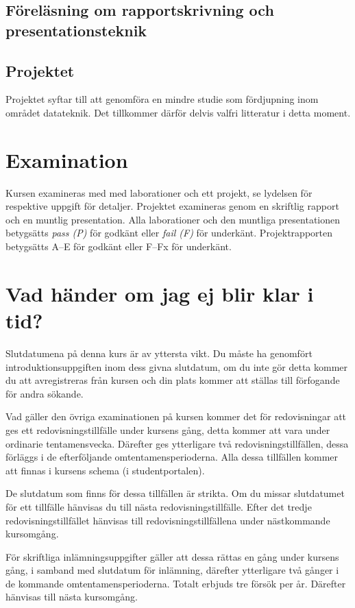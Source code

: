 \documentclass[a4paper,logo]{miunart}
\begin{document}
\subsection{Föreläsning om rapportskrivning och presentationsteknik}


\subsection{Projektet}
Projektet syftar till att genomföra en mindre studie som fördjupning inom 
området datateknik.
Det tillkommer därför delvis valfri litteratur i detta moment.


\section{Examination}
\label{sec:exam}
Kursen examineras med med laborationer och ett projekt, se lydelsen för 
respektive uppgift för detaljer.
Projektet examineras genom en skriftlig rapport och en muntlig presentation.
Alla laborationer och den muntliga presentationen betygsätts \emph{pass (P)} 
för godkänt eller \emph{fail (F)} för underkänt.
Projektrapporten betygsätts A--E för godkänt eller F--Fx för underkänt.


\section{Vad händer om jag ej blir klar i tid?}
\label{sec:late}
Slutdatumena på denna kurs är av yttersta vikt.
Du måste ha genomfört introduktionsuppgiften inom dess givna slutdatum, om du 
inte gör detta kommer du att avregistreras från kursen och din plats kommer att 
ställas till förfogande för andra sökande.

Vad gäller den övriga examinationen på kursen kommer det för redovisningar att 
ges ett redovisningstillfälle under kursens gång, detta kommer att vara under 
ordinarie tentamensvecka.
Därefter ges ytterligare två redovisningstillfällen, dessa förläggs i de 
efterföljande omtentamensperioderna.
Alla dessa tillfällen kommer att finnas i kursens schema (i studentportalen).

De slutdatum som finns för dessa tillfällen är strikta.
Om du missar slutdatumet för ett tillfälle hänvisas du till nästa 
redovisningstillfälle.
Efter det tredje redovisningstillfället hänvisas till redovisningstillfällena 
under nästkommande kursomgång.

För skriftliga inlämningsuppgifter gäller att dessa rättas en gång under 
kursens gång, i samband med slutdatum för inlämning, därefter ytterligare två 
gånger i de kommande omtentamensperioderna.
Totalt erbjuds tre försök per år.
Därefter hänvisas till nästa kursomgång.
\end{document}
